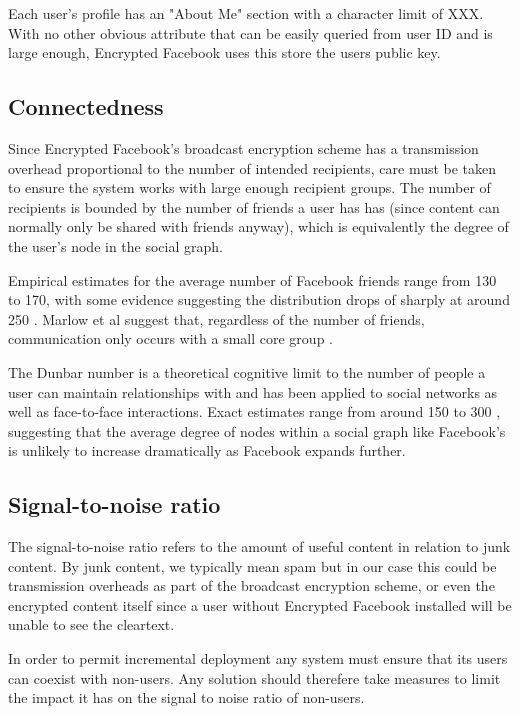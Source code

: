 Each user's profile has an "About Me" section with a character limit of XXX. With no other obvious attribute that can be easily queried from user ID and is large enough, Encrypted Facebook uses this store the users public key.


    
\subsection{Connectedness}

Since Encrypted Facebook's broadcast encryption scheme has a transmission overhead proportional to the number of intended recipients, care must be taken to ensure the system works with large enough recipient groups. The number of recipients is bounded by the number of friends a user has has (since content can normally only be shared with friends anyway), which is equivalently the degree of the user's node in the social graph. 

Empirical estimates for the average number of Facebook friends range from 130 to 170, with some evidence suggesting the distribution drops of sharply at around 250 \cite{fb-factsheet} \cite{fb-connectedness}. Marlow et al suggest that, regardless of the number of friends, communication only occurs with a small core group \cite{burke2010social}.

The Dunbar number is a theoretical cognitive limit to the number of people a user can maintain relationships with and has been applied to social networks as well as face-to-face interactions. Exact estimates range from around 150 to 300 \cite{xxx} \cite{xxx}, suggesting that the average degree of nodes within a social graph like Facebook's is unlikely to increase dramatically as Facebook expands further.


\subsection{Signal-to-noise ratio}

The signal-to-noise ratio refers to the amount of useful content in relation to junk content. By junk content, we typically mean spam but in our case this could be transmission overheads as part of the broadcast encryption scheme, or even the encrypted content itself since a user without Encrypted Facebook installed will be unable to see the cleartext.

In order to permit incremental deployment any system must ensure that its users can coexist with non-users. Any solution should therefere take measures to limit the impact it has on the signal to noise ratio of non-users.



